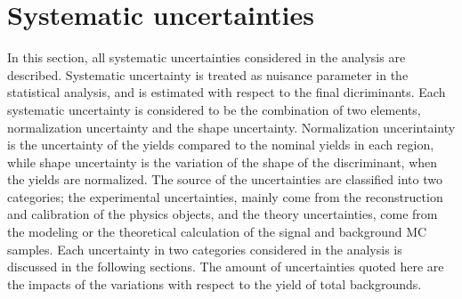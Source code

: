 \chapter{Systematic uncertainties}
\label{chap:systematics}
In this section, all systematic uncertainties considered in the analysis are described. 
Systematic uncertainty is treated as nuisance parameter in the statistical analysis, and is estimated with respect to the final dicriminants.
Each systematic uncertainty is considered to be the combination of two elements, normalization uncertainty and the shape uncertainty. 
Normalization uncerintainty is the uncertainty of the yields compared to the nominal yields in each region, while shape uncertainty is the variation of the shape of the discriminant, when the yields are normalized.
The source of the uncertainties are classified into two categories; the experimental uncertainties, mainly come from the reconstruction and calibration of the physics objects, and the theory uncertainties, come from the modeling or the theoretical calculation of the signal and background MC samples.
Each uncertainty in two categories considered in the analysis is discussed in the following sections. The amount of uncertainties quoted here are the impacts of the variations with respect to the yield of total backgrounds.

